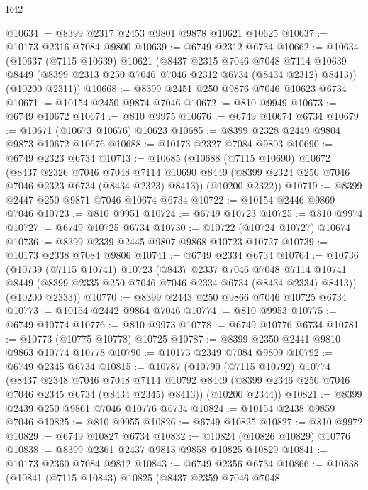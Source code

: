 \begin{lexlean}{R42}
\begin{coremodule}
{@10634 := @8399 @2317 @2453 @9801 @9878 @10621 @10625
@10637 := @10173 @2316 @7084 @9800
@10639 := @6749 @2312 @6734
@10662 := @10634
    (@10637
      (@7115 @10639)
      @10621
      (@8437
        @2315
        @7046
        @7048
        @7114
        @10639
        @8449
        (@8399 @2313 @250 @7046 @7046 @2312 @6734 (@8434 @2312) @8413))
      (@10200 @2311))
@10668 := @8399 @2451 @250 @9876 @7046 @10623 @6734
@10671 := @10154 @2450 @9874 @7046
@10672 := @810 @9949
@10673 := @6749 @10672
@10674 := @810 @9975
@10676 := @6749 @10674 @6734
@10679 := @10671 (@10673 @10676) @10623
@10685 := @8399 @2328 @2449 @9804 @9873 @10672 @10676
@10688 := @10173 @2327 @7084 @9803
@10690 := @6749 @2323 @6734
@10713 := @10685
    (@10688
      (@7115 @10690)
      @10672
      (@8437
        @2326
        @7046
        @7048
        @7114
        @10690
        @8449
        (@8399 @2324 @250 @7046 @7046 @2323 @6734 (@8434 @2323) @8413))
      (@10200 @2322))
@10719 := @8399 @2447 @250 @9871 @7046 @10674 @6734
@10722 := @10154 @2446 @9869 @7046
@10723 := @810 @9951
@10724 := @6749 @10723
@10725 := @810 @9974
@10727 := @6749 @10725 @6734
@10730 := @10722 (@10724 @10727) @10674
@10736 := @8399 @2339 @2445 @9807 @9868 @10723 @10727
@10739 := @10173 @2338 @7084 @9806
@10741 := @6749 @2334 @6734
@10764 := @10736
    (@10739
      (@7115 @10741)
      @10723
      (@8437
        @2337
        @7046
        @7048
        @7114
        @10741
        @8449
        (@8399 @2335 @250 @7046 @7046 @2334 @6734 (@8434 @2334) @8413))
      (@10200 @2333))
@10770 := @8399 @2443 @250 @9866 @7046 @10725 @6734
@10773 := @10154 @2442 @9864 @7046
@10774 := @810 @9953
@10775 := @6749 @10774
@10776 := @810 @9973
@10778 := @6749 @10776 @6734
@10781 := @10773 (@10775 @10778) @10725
@10787 := @8399 @2350 @2441 @9810 @9863 @10774 @10778
@10790 := @10173 @2349 @7084 @9809
@10792 := @6749 @2345 @6734
@10815 := @10787
    (@10790
      (@7115 @10792)
      @10774
      (@8437
        @2348
        @7046
        @7048
        @7114
        @10792
        @8449
        (@8399 @2346 @250 @7046 @7046 @2345 @6734 (@8434 @2345) @8413))
      (@10200 @2344))
@10821 := @8399 @2439 @250 @9861 @7046 @10776 @6734
@10824 := @10154 @2438 @9859 @7046
@10825 := @810 @9955
@10826 := @6749 @10825
@10827 := @810 @9972
@10829 := @6749 @10827 @6734
@10832 := @10824 (@10826 @10829) @10776
@10838 := @8399 @2361 @2437 @9813 @9858 @10825 @10829
@10841 := @10173 @2360 @7084 @9812
@10843 := @6749 @2356 @6734
@10866 := @10838
    (@10841
      (@7115 @10843)
      @10825
      (@8437
        @2359
        @7046
        @7048
}
\end{coremodule}
\end{lexlean}
